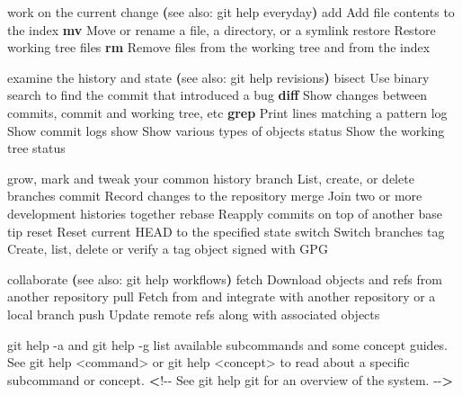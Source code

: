 \documentclass[
]{book}
\newenvironment{Shaded}{\begin{snugshade}}{\end{snugshade}}
\newcommand{\AttributeTok}[1]{\textcolor[rgb]{0.13,0.29,0.53}{#1}}
\newcommand{\ErrorTok}[1]{\textcolor[rgb]{0.64,0.00,0.00}{\textbf{#1}}}
\newcommand{\ExtensionTok}[1]{#1}
\newcommand{\FunctionTok}[1]{\textcolor[rgb]{0.13,0.29,0.53}{\textbf{#1}}}
\newcommand{\KeywordTok}[1]{\textcolor[rgb]{0.13,0.29,0.53}{\textbf{#1}}}
\newcommand{\NormalTok}[1]{#1}
\newcommand{\OperatorTok}[1]{\textcolor[rgb]{0.81,0.36,0.00}{\textbf{#1}}}
\newcommand{\StringTok}[1]{\textcolor[rgb]{0.31,0.60,0.02}{#1}}
\begin{document}
\begin{Shaded}
\begin{Highlighting}[]
\ExtensionTok{work}\NormalTok{ on the current change }\ErrorTok{(}\ExtensionTok{see}\NormalTok{ also: git help everyday}\KeywordTok{)}
   \ExtensionTok{add}\NormalTok{       Add file contents to the index}
   \FunctionTok{mv}\NormalTok{        Move or rename a file, a directory, or a symlink}
   \ExtensionTok{restore}\NormalTok{   Restore working tree files}
   \FunctionTok{rm}\NormalTok{        Remove files from the working tree and from the index}

\ExtensionTok{examine}\NormalTok{ the history and state }\ErrorTok{(}\ExtensionTok{see}\NormalTok{ also: git help revisions}\KeywordTok{)}
   \ExtensionTok{bisect}\NormalTok{    Use binary search to find the commit that introduced a bug}
   \FunctionTok{diff}\NormalTok{      Show changes between commits, commit and working tree, etc}
   \FunctionTok{grep}\NormalTok{      Print lines matching a pattern}
   \ExtensionTok{log}\NormalTok{       Show commit logs}
   \ExtensionTok{show}\NormalTok{      Show various types of objects}
   \ExtensionTok{status}\NormalTok{    Show the working tree status}

\ExtensionTok{grow,}\NormalTok{ mark and tweak your common history}
   \ExtensionTok{branch}\NormalTok{    List, create, or delete branches}
   \ExtensionTok{commit}\NormalTok{    Record changes to the repository}
   \ExtensionTok{merge}\NormalTok{     Join two or more development histories together}
   \ExtensionTok{rebase}\NormalTok{    Reapply commits on top of another base tip}
   \ExtensionTok{reset}\NormalTok{     Reset current HEAD to the specified state}
   \ExtensionTok{switch}\NormalTok{    Switch branches}
   \ExtensionTok{tag}\NormalTok{       Create, list, delete or verify a tag object signed with GPG}

\ExtensionTok{collaborate} \ErrorTok{(}\ExtensionTok{see}\NormalTok{ also: git help workflows}\KeywordTok{)}
   \ExtensionTok{fetch}\NormalTok{     Download objects and refs from another repository}
   \ExtensionTok{pull}\NormalTok{      Fetch from and integrate with another repository or a local branch}
   \ExtensionTok{push}\NormalTok{      Update remote refs along with associated objects}

\StringTok{\textquotesingle{}git help {-}a\textquotesingle{}}\NormalTok{ and }\StringTok{\textquotesingle{}git help {-}g\textquotesingle{}}\NormalTok{ list available subcommands and some}
\ExtensionTok{concept}\NormalTok{ guides. See }\StringTok{\textquotesingle{}git help \textless{}command\textgreater{}\textquotesingle{}}\NormalTok{ or }\StringTok{\textquotesingle{}git help \textless{}concept\textgreater{}\textquotesingle{}}
\ExtensionTok{to}\NormalTok{ read about a specific subcommand or concept.}
\OperatorTok{\textless{}}\NormalTok{!{-}{-} }\ExtensionTok{See} \StringTok{\textquotesingle{}git help git\textquotesingle{}}\NormalTok{ for an overview of the system. }\AttributeTok{{-}{-}}\OperatorTok{\textgreater{}}
\end{Highlighting}
\end{Shaded}
\end{document}

